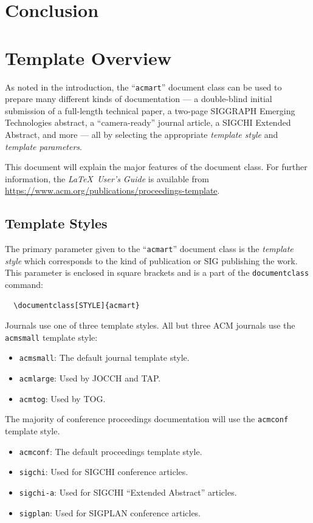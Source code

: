 \documentclass[acmsmall]{acmart}
\begin{document}
\section{Conclusion}

\section{Template Overview}
As noted in the introduction, the ``\verb|acmart|'' document class can
be used to prepare many different kinds of documentation --- a
double-blind initial submission of a full-length technical paper, a
two-page SIGGRAPH Emerging Technologies abstract, a ``camera-ready''
journal article, a SIGCHI Extended Abstract, and more --- all by
selecting the appropriate {\itshape template style} and {\itshape
  template parameters}.

This document will explain the major features of the document
class. For further information, the {\itshape \LaTeX\ User's Guide} is
available from
\url{https://www.acm.org/publications/proceedings-template}.

\subsection{Template Styles}

The primary parameter given to the ``\verb|acmart|'' document class is
the {\itshape template style} which corresponds to the kind of publication
or SIG publishing the work. This parameter is enclosed in square
brackets and is a part of the {\verb|documentclass|} command:
\begin{verbatim}
  \documentclass[STYLE]{acmart}
\end{verbatim}

Journals use one of three template styles. All but three ACM journals
use the {\verb|acmsmall|} template style:
\begin{itemize}
\item {\verb|acmsmall|}: The default journal template style.
\item {\verb|acmlarge|}: Used by JOCCH and TAP.
\item {\verb|acmtog|}: Used by TOG.
\end{itemize}

The majority of conference proceedings documentation will use the {\verb|acmconf|} template style.
\begin{itemize}
\item {\verb|acmconf|}: The default proceedings template style.
\item{\verb|sigchi|}: Used for SIGCHI conference articles.
\item{\verb|sigchi-a|}: Used for SIGCHI ``Extended Abstract'' articles.
\item{\verb|sigplan|}: Used for SIGPLAN conference articles.
\end{itemize}
\end{document}
